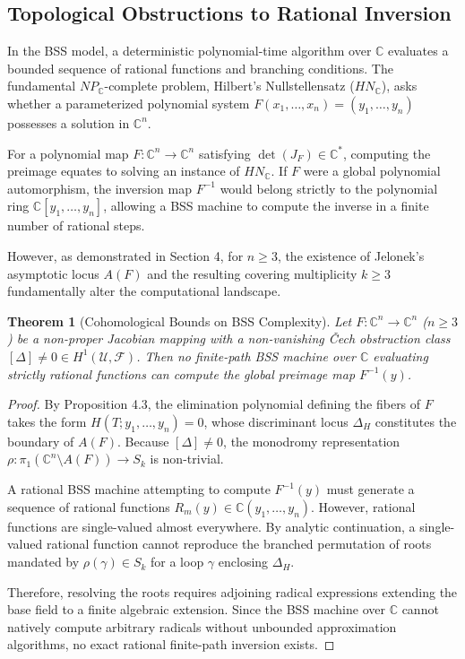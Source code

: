 \documentclass[11pt,reqno]{amsart}
\newtheorem{theorem}{Theorem}[section]
\theoremstyle{definition}
\begin{document}
\subsection{Topological Obstructions to Rational Inversion}
In the BSS model, a deterministic polynomial-time algorithm over $\mathbb{C}$ evaluates a bounded sequence of rational functions and branching conditions. The fundamental $NP_{\mathbb{C}}$-complete problem, Hilbert's Nullstellensatz ($HN_{\mathbb{C}}$), asks whether a parameterized polynomial system $F(x_1, \dots, x_n) = (y_1, \dots, y_n)$ possesses a solution in $\mathbb{C}^n$.

For a polynomial map $F: \mathbb{C}^n \to \mathbb{C}^n$ satisfying $\det(J_F) \in \mathbb{C}^*$, computing the preimage equates to solving an instance of $HN_{\mathbb{C}}$. If $F$ were a global polynomial automorphism, the inversion map $F^{-1}$ would belong strictly to the polynomial ring $\mathbb{C}[y_1, \dots, y_n]$, allowing a BSS machine to compute the inverse in a finite number of rational steps. 

However, as demonstrated in Section 4, for $n \ge 3$, the existence of Jelonek's asymptotic locus $A(F)$ and the resulting covering multiplicity $k \ge 3$ fundamentally alter the computational landscape.

\begin{theorem}[Cohomological Bounds on BSS Complexity]
Let $F: \mathbb{C}^n \to \mathbb{C}^n$ ($n \ge 3$) be a non-proper Jacobian mapping with a non-vanishing \v{C}ech obstruction class $[\Delta] \neq 0 \in H^1(\mathcal{U}, \mathcal{F})$. Then no finite-path BSS machine over $\mathbb{C}$ evaluating strictly rational functions can compute the global preimage map $F^{-1}(y)$.
\end{theorem}

\begin{proof}
By Proposition 4.3, the elimination polynomial defining the fibers of $F$ takes the form $H(T; y_1, \dots, y_n) = 0$, whose discriminant locus $\Delta_H$ constitutes the boundary of $A(F)$. Because $[\Delta] \neq 0$, the monodromy representation $\rho: \pi_1(\mathbb{C}^n \setminus A(F)) \to S_k$ is non-trivial. 

A rational BSS machine attempting to compute $F^{-1}(y)$ must generate a sequence of rational functions $R_m(y) \in \mathbb{C}(y_1, \dots, y_n)$. However, rational functions are single-valued almost everywhere. By analytic continuation, a single-valued rational function cannot reproduce the branched permutation of roots mandated by $\rho(\gamma) \in S_k$ for a loop $\gamma$ enclosing $\Delta_H$. 

Therefore, resolving the roots requires adjoining radical expressions extending the base field to a finite algebraic extension. Since the BSS machine over $\mathbb{C}$ cannot natively compute arbitrary radicals without unbounded approximation algorithms, no exact rational finite-path inversion exists.
\end{proof}
\end{document}
